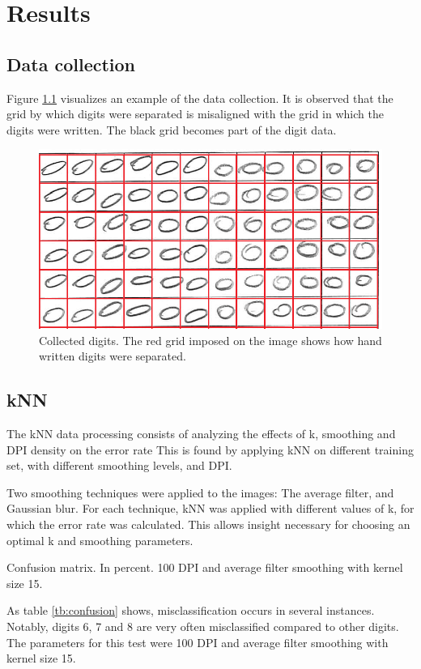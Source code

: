 \chapter{Results}
\section{Data collection}

Figure \ref{fig:misalignment} visualizes an example of the data collection.
It is observed that the grid by which digits were separated is misaligned with the grid
in which the digits were written. The black grid becomes part of the digit data.
\begin{figure}[H]
\centering
\includegraphics[width  =\textwidth]{figure/kiddi-01-grid-nosmooth-300dpi_cut.png}
\caption{Collected digits. The red grid imposed on the image shows how hand written digits were separated.}
\label{fig:misalignment}
\end{figure}

\section{kNN}
The kNN data processing consists of analyzing the effects of k, smoothing and
DPI density on the error rate  This is found by applying kNN on different training set,
with different smoothing levels, and DPI.

Two smoothing techniques were applied to the images: The average filter, and Gaussian blur.  
For each technique, kNN was applied with different values of k, for which the error rate was calculated.
This allows insight necessary for choosing an optimal k and smoothing parameters.

\begin{table}[h]

\caption{Confusion matrix. In percent. 100 DPI and average filter smoothing with kernel size 15.}
\label{tb:confusion}
\end{table}
As table
\ref{tb:confusion}
shows, misclassification occurs in several instances.
Notably, digits 6, 7 and 8 are very often misclassified compared to other digits.
The parameters for this test were 100 DPI and average filter smoothing with kernel size 15.

